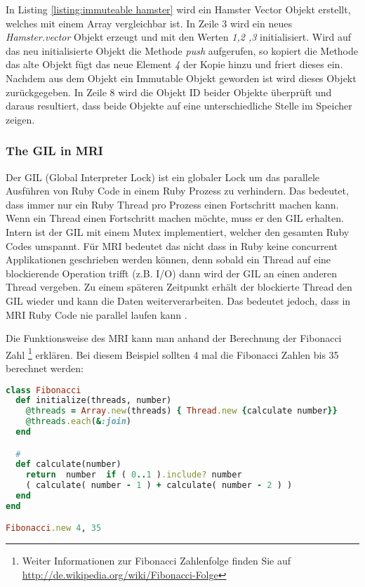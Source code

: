 In Listing \ref{listing:immuteable hamster} wird ein Hamster Vector Objekt erstellt, welches mit einem Array vergleichbar ist. In Zeile 3 wird ein neues \emph{Hamster.vector} Objekt erzeugt und mit den Werten \emph{1,2 ,3} initialisiert. Wird auf das neu initialisierte Objekt die Methode \emph{push} aufgerufen, so kopiert die Methode das alte Objekt fügt das neue Element \emph{4} der Kopie hinzu und friert dieses ein. Nachdem aus dem Objekt ein Immutable Objekt geworden ist wird dieses Objekt zurückgegeben. In Zeile 8 wird die Objekt ID beider Objekte überprüft und daraus resultiert, dass beide Objekte auf eine unterschiedliche Stelle im Speicher zeigen. 

\subsubsection{The GIL in MRI}

Der GIL (Global Interpreter Lock) ist ein globaler Lock um das parallele Ausführen von Ruby Code in einem Ruby Prozess zu verhindern. Das bedeutet, dass immer nur ein Ruby Thread pro Prozess einen Fortschritt machen kann. Wenn ein Thread einen Fortschritt machen möchte, muss er den GIL erhalten. Intern ist der GIL mit einem Mutex implementiert, welcher den gesamten Ruby Codes umspannt. Für MRI bedeutet das nicht dass in Ruby keine concurrent Applikationen geschrieben werden können, denn sobald ein Thread auf eine blockierende Operation trifft (z.B. I/O) dann wird der GIL an einen anderen Thread vergeben. Zu einem späteren Zeitpunkt erhält der blockierte Thread den GIL wieder und kann die Daten weiterverarbeiten. Das bedeutet jedoch, dass in MRI Ruby Code nie parallel laufen kann \cite[p. 42]{Sto2013}. 


Die Funktionsweise des MRI kann man anhand der Berechnung der Fibonacci Zahl \footnote{Weiter Informationen zur Fibonacci Zahlenfolge finden Sie auf \url{http://de.wikipedia.org/wiki/Fibonacci-Folge}} erklären. Bei diesem Beispiel sollten 4 mal die Fibonacci Zahlen bis 35 berechnet werden:

\begin{lstlisting}[language=Ruby,label={listing:fibonacci},caption={Adaptiert von \cite{Sto2013}, Seite 21}]
class Fibonacci
  def initialize(threads, number)
    @threads = Array.new(threads) { Thread.new {calculate number}}
    @threads.each(&:join)
  end

  #
  def calculate(number)
    return  number  if ( 0..1 ).include? number
    ( calculate( number - 1 ) + calculate( number - 2 ) )
  end
end

Fibonacci.new 4, 35
\end{lstlisting}

